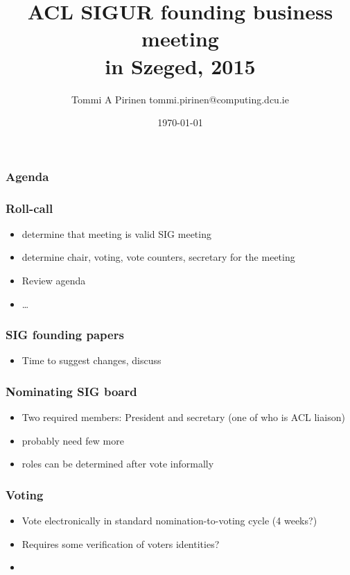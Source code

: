 \documentclass{beamer}
\title{ACL SIGUR founding business meeting\\
\scriptsize{in Szeged, 2015}}
\author{Tommi A Pirinen \scriptsize \guilsinglleft tommi.pirinen@computing.dcu.ie \guilsinglright }
\institute{DCU, CNGL}
\date{\today}
\makeatletter
\newcommand\listofframes{\@starttoc{lbf}}
\makeatother
\begin{document}

\maketitle

\begin{frame}
    \frametitle{Agenda}
    \listofframes
\end{frame}

\begin{frame}
    \frametitle{Roll-call}
    \begin{itemize}
        \item determine that meeting is valid SIG meeting
        \item determine chair, voting, vote counters, secretary for the meeting
        \item Review agenda
        \item 
            \ldots
    \end{itemize}
\end{frame}

\begin{frame}
    \frametitle{SIG founding papers}
    \begin{itemize}
        \item Time to suggest changes, discuss
    \end{itemize}
\end{frame}

\begin{frame}
    \frametitle{Nominating SIG board}
    \begin{itemize}
        \item Two required members:
            President and secretary (one of who is ACL liaison)
        \item probably need few more
        \item roles can be determined after vote informally
    \end{itemize}
\end{frame}

\begin{frame}
\frametitle{Voting}

\begin{itemize}
    \item Vote electronically in standard nomination-to-voting cycle (4 weeks?)
    \item Requires some verification of voters identities?
    \item 
\end{itemize}
\end{frame}
\end{document}
